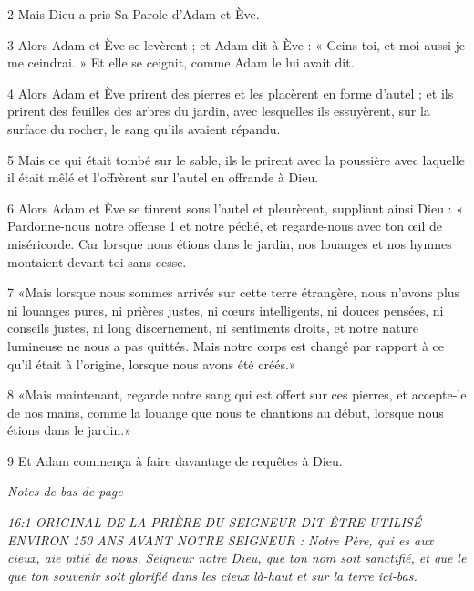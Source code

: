 \par 2 Mais Dieu a pris Sa Parole d'Adam et Ève.

\par 3 Alors Adam et Ève se levèrent ; et Adam dit à Ève : « Ceins-toi, et moi aussi je me ceindrai. » Et elle se ceignit, comme Adam le lui avait dit.

\par 4 Alors Adam et Ève prirent des pierres et les placèrent en forme d'autel ; et ils prirent des feuilles des arbres du jardin, avec lesquelles ils essuyèrent, sur la surface du rocher, le sang qu'ils avaient répandu.

\par 5 Mais ce qui était tombé sur le sable, ils le prirent avec la poussière avec laquelle il était mêlé et l'offrèrent sur l'autel en offrande à Dieu.

\par 6 Alors Adam et Ève se tinrent sous l'autel et pleurèrent, suppliant ainsi Dieu : « Pardonne-nous notre offense 1 et notre péché, et regarde-nous avec ton œil de miséricorde. Car lorsque nous étions dans le jardin, nos louanges et nos hymnes montaient devant toi sans cesse.

\par 7 «Mais lorsque nous sommes arrivés sur cette terre étrangère, nous n'avons plus ni louanges pures, ni prières justes, ni cœurs intelligents, ni douces pensées, ni conseils justes, ni long discernement, ni sentiments droits, et notre nature lumineuse ne nous a pas quittés. Mais notre corps est changé par rapport à ce qu'il était à l'origine, lorsque nous avons été créés.»

\par 8 «Mais maintenant, regarde notre sang qui est offert sur ces pierres, et accepte-le de nos mains, comme la louange que nous te chantions au début, lorsque nous étions dans le jardin.»

\par 9 Et Adam commença à faire davantage de requêtes à Dieu.

\par \textit{Notes de bas de page}

\par \textit{16:1 ORIGINAL DE LA PRIÈRE DU SEIGNEUR DIT ÊTRE UTILISÉ ENVIRON 150 ANS AVANT NOTRE SEIGNEUR : Notre Père, qui es aux cieux, aie pitié de nous, Seigneur notre Dieu, que ton nom soit sanctifié, et que le que ton souvenir soit glorifié dans les cieux là-haut et sur la terre ici-bas.}

